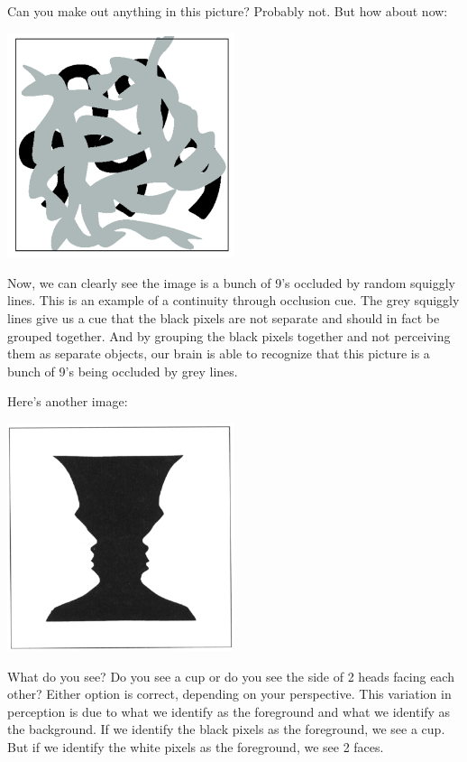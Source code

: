 \documentclass{article}
\begin{document}
Can you make out anything in this picture? Probably not. But how about now:

\begin{center}
\includegraphics[width=0.5\textwidth]{continuity-occlusion-2.png}
\end{center}

Now, we can clearly see the image is a bunch of 9's occluded by random squiggly lines. This is an example of a continuity through occlusion cue. The grey squiggly lines give us a cue that the black pixels are not separate and should in fact be grouped together. And by grouping the black pixels together and not perceiving them as separate objects, our brain is able to recognize that this picture is a bunch of 9's being occluded by grey lines.

Here's another image:
\begin{center}
\includegraphics[width=0.5\textwidth]{figure-ground.png}
\end{center}

What do you see? Do you see a cup or do you see the side of 2 heads facing each other? Either option is correct, depending on your perspective. This variation in perception is due to what we identify as the foreground and what we identify as the background. If we identify the black pixels as the foreground, we see a cup. But if we identify the white pixels as the foreground, we see 2 faces.
\end{document}

